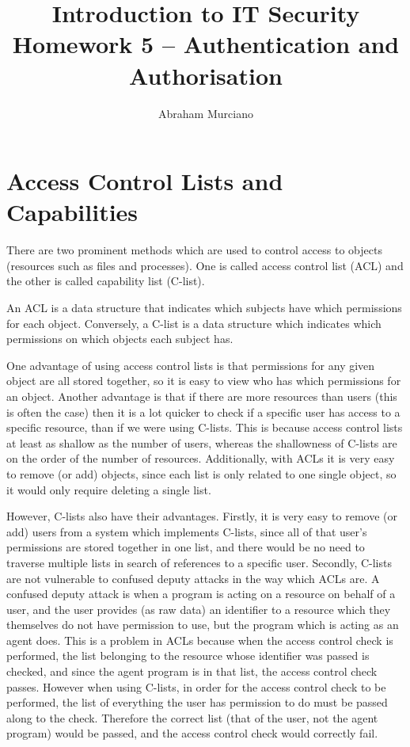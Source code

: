 \documentclass{article}
\title{Introduction to IT Security\\
\medskip
\large Homework 5 -- Authentication and Authorisation}
\author{Abraham Murciano}
\begin{document}
\maketitle

\section{Access Control Lists and Capabilities}

There are two prominent methods which are used to control access to objects (resources such as files and processes). One is called access control list (ACL) and the other is called capability list (C-list).

An ACL is a data structure that indicates which subjects have which permissions for each object. Conversely, a C-list is a data structure which indicates which permissions on which objects each subject has.

One advantage of using access control lists is that permissions for any given object are all stored together, so it is easy to view who has which permissions for an object. Another advantage is that if there are more resources than users (this is often the case) then it is a lot quicker to check if a specific user has access to a specific resource, than if we were using C-lists. This is because access control lists at least as shallow as the number of users, whereas the shallowness of C-lists are on the order of the number of resources. Additionally, with ACLs it is very easy to remove (or add) objects, since each list is only related to one single object, so it would only require deleting a single list.

However, C-lists also have their advantages. Firstly, it is very easy to remove (or add) users from a system which implements C-lists, since all of that user's permissions are stored together in one list, and there would be no need to traverse multiple lists in search of references to a specific user. Secondly, C-lists are not vulnerable to confused deputy attacks in the way which ACLs are. A confused deputy attack is when a program is acting on a resource on behalf of a user, and the user provides (as raw data) an identifier to a resource which they themselves do not have permission to use, but the program which is acting as an agent does. This is a problem in ACLs because when the access control check is performed, the list belonging to the resource whose identifier was passed is checked, and since the agent program is in that list, the access control check passes. However when using C-lists, in order for the access control check to be performed, the list of everything the user has permission to do must be passed along to the check. Therefore the correct list (that of the user, not the agent program) would be passed, and the access control check would correctly fail.
\end{document}

